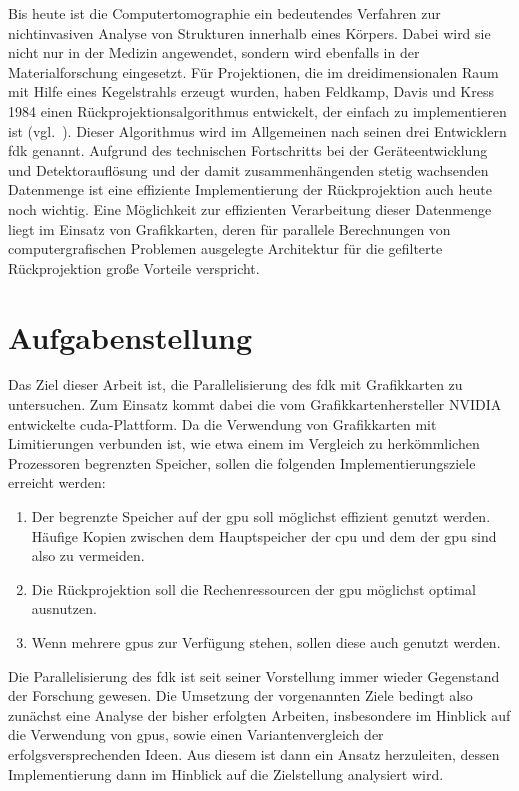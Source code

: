 Bis heute ist die Computertomographie ein bedeutendes Verfahren zur nichtinvasiven Analyse von Strukturen innerhalb
eines Körpers. Dabei wird sie nicht nur in der Medizin angewendet, sondern wird ebenfalls in der Materialforschung
eingesetzt. Für Projektionen, die im dreidimensionalen Raum mit Hilfe eines Kegelstrahls erzeugt wurden, haben Feldkamp,
Davis und Kress 1984 einen Rückprojektionsalgorithmus entwickelt, der einfach zu implementieren ist (vgl.~\cite{fdk}).
Dieser Algorithmus wird im Allgemeinen nach seinen drei Entwicklern \gls{fdk} genannt. Aufgrund des technischen
Fortschritts bei der Geräteentwicklung und Detektorauflösung und der damit zusammenhängenden stetig wachsenden
Datenmenge ist eine effiziente Implementierung der Rückprojektion auch heute noch wichtig. Eine Möglichkeit zur
effizienten Verarbeitung dieser Datenmenge liegt im Einsatz von Grafikkarten, deren für parallele Berechnungen von
computergrafischen Problemen ausgelegte Architektur für die gefilterte Rückprojektion große Vorteile verspricht.

\section{Aufgabenstellung}\label{intro:aufgabenstellung}

Das Ziel dieser Arbeit ist, die Parallelisierung des \gls{fdk} mit Grafikkarten zu untersuchen. Zum Einsatz kommt dabei
die vom Grafikkartenhersteller NVIDIA entwickelte \gls{cuda}-Plattform. Da die Verwendung von Grafikkarten mit
Limitierungen verbunden ist, wie etwa einem im Vergleich zu herkömmlichen Prozessoren begrenzten Speicher, sollen die
folgenden Implementierungsziele erreicht werden:

\begin{enumerate}
    \item Der begrenzte Speicher auf der \gls{gpu} soll möglichst effizient genutzt werden. Häufige Kopien zwischen dem
          Hauptspeicher der \gls{cpu} und dem der \gls{gpu} sind also zu vermeiden.
    \item Die Rückprojektion soll die Rechenressourcen der \gls{gpu} möglichst optimal ausnutzen.
    \item Wenn mehrere \gls{gpu}s zur Verfügung stehen, sollen diese auch genutzt werden.
\end{enumerate}

Die Parallelisierung des \gls{fdk} ist seit seiner Vorstellung immer wieder Gegenstand der Forschung gewesen. Die
Umsetzung der vorgenannten Ziele bedingt also zunächst eine Analyse der bisher erfolgten Arbeiten, insbesondere im
Hinblick auf die Verwendung von \gls{gpu}s, sowie einen Variantenvergleich der erfolgsversprechenden Ideen. Aus diesem
ist dann ein Ansatz herzuleiten, dessen Implementierung dann im Hinblick auf die Zielstellung analysiert wird.
